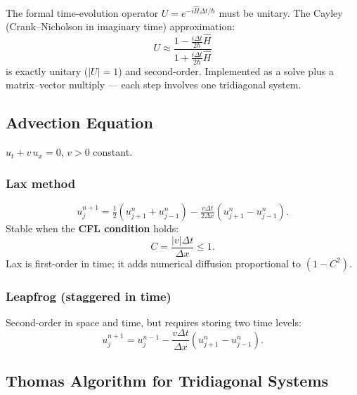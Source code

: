 The formal time-evolution operator $U = e^{-i\hat{H}\Delta t/\hbar}$
must be unitary.  The Cayley (Crank–Nicholson in imaginary time)
approximation:
\begin{equation}
  U \approx \frac{1 - \tfrac{i\Delta t}{2\hbar}\hat{H}}
             {1 + \tfrac{i\Delta t}{2\hbar}\hat{H}}
  \label{eq:lec17:cayley}
\end{equation}
is exactly unitary ($|U|=1$) and second-order.  Implemented as a
solve plus a matrix–vector multiply — each step involves one tridiagonal
system.

\subsection{Advection Equation}\label{subsec:lec17:advection}

$u_t + v\,u_x = 0$, $v>0$ constant.

\subsubsection*{Lax method}
\begin{equation}
  u_j^{n+1} = \tfrac{1}{2}(u_{j+1}^n + u_{j-1}^n)
             - \tfrac{v\Delta t}{2\Delta x}(u_{j+1}^n - u_{j-1}^n).
  \label{eq:lec17:lax}
\end{equation}
Stable when the \textbf{CFL condition} holds:
\begin{equation}
  \boxed{C = \frac{|v|\Delta t}{\Delta x} \le 1.}
  \label{eq:lec17:cfl}
\end{equation}
Lax is first-order in time; it adds numerical diffusion proportional
to $(1-C^2)$.

\subsubsection*{Leapfrog (staggered in time)}
Second-order in space and time, but requires storing two time levels:
\begin{equation}
  u_j^{n+1} = u_j^{n-1}
             - \frac{v\Delta t}{\Delta x}(u_{j+1}^n - u_{j-1}^n).
  \label{eq:lec17:leapfrog}
\end{equation}

\subsection{Thomas Algorithm for Tridiagonal Systems}\label{subsec:lec17:thomas}


